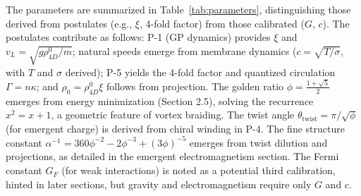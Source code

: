 The parameters are summarized in Table~\ref{tab:parameters}, distinguishing those derived from postulates (e.g., $\xi$, 4-fold factor) from those calibrated ($G$, $c$). The postulates contribute as follows: P-1 (GP dynamics) provides $\xi$ and $v_L = \sqrt{g \rho_{4D}^0 / m}$; natural speeds emerge from membrane dynamics ($c = \sqrt{T / \sigma}$, with $T$ and $\sigma$ derived); P-5 yields the 4-fold factor and quantized circulation $\Gamma = n \kappa$; and $\rho_0 = \rho_{4D}^0 \xi$ follows from projection. The golden ratio $\phi = \frac{1 + \sqrt{5}}{2}$ emerges from energy minimization (Section 2.5), solving the recurrence $x^2 = x + 1$, a geometric feature of vortex braiding. The twist angle $\theta_{\text{twist}} = \pi / \sqrt{\phi}$ (for emergent charge) is derived from chiral winding in P-4. The fine structure constant $\alpha^{-1} = 360 \phi^{-2} - 2 \phi^{-3} + (3 \phi)^{-5}$ emerges from twist dilution and projections, as detailed in the emergent electromagnetism section. The Fermi constant $G_F$ (for weak interactions) is noted as a potential third calibration, hinted in later sections, but gravity and electromagnetism require only $G$ and $c$.

